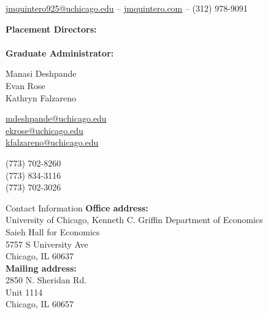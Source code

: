 \documentclass{resume} %
\begin{document}
	\vspace{-8mm}
	\begin{center}
		\href{mailto:jmquintero925@uchicago.edu}{jmquintero925@uchicago.edu} -- \href{https://jmquintero.com}{jmquintero.com} -- (312) 978-9091
	\end{center}
	\vspace{2mm}
	\begin{minipage}[t]{0.32\textwidth}
		\textbf{Placement Directors:}\\
		\\
		\textbf{Graduate Administrator:}\\
	\end{minipage}
	\begin{minipage}[t]{0.23\textwidth}
		Manasi Deshpande\\
		Evan Rose\\
		Kathryn Falzareno\\
	\end{minipage}
	\begin{minipage}[t]{0.29\textwidth}
		\href{mailto:mdeshpande@uchicago.edu}{mdeshpande@uchicago.edu}\\
		\href{mailto:ekrose@uchicago.edu}{ekrose@uchicago.edu}\\
		\href{mailto:kfalzareno@uchicago.edu}{kfalzareno@uchicago.edu}\\
	\end{minipage}
	\begin{minipage}[t]{0.15\textwidth}
		(773) 702-8260\\
		(773) 834-3116\\
		(773) 702-3026\\
	\end{minipage}

		\begin{rSection}{Contact Information}
			\textbf{Office address:}\\
			University of Chicago, Kenneth C. Griffin Department of Economics\\
			Saieh Hall for Economics\\
			5757 S University Ave\\
			Chicago, IL 60637\\

			\textbf{Mailing address:}\\
			2850 N. Sheridan Rd.\\
			Unit 1114\\
			Chicago, IL 60657
		\end{rSection}
\end{document}
